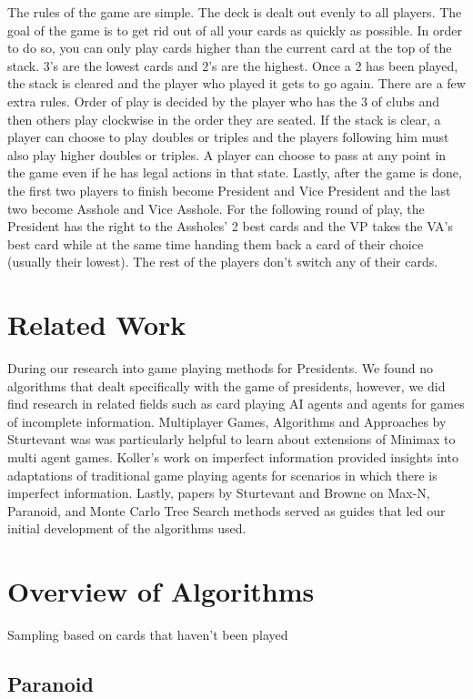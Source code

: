 \documentclass[11pt]{article}
\begin{document}
The rules of the game are simple. The deck is dealt out evenly to all players. The goal of the game is to get rid out of all your cards as quickly as possible. In order to do so, you can only play cards higher than the current card at the top of the stack. 3's are the lowest cards and 2's are the highest. Once a 2 has been played, the stack is cleared and the player who played it gets to go again. There are a few extra rules. Order of play is decided by the player who has the 3 of clubs and then others play clockwise in the order they are seated. If the stack is clear, a player can choose to play doubles or triples and the players following him must also play higher doubles or triples. A player can choose to pass at any point in the game even if he has legal actions in that state. Lastly, after the game is done, the first two players to finish become President and Vice President and the last two become Asshole and Vice Asshole. For the following round of play, the President has the right to the Assholes' 2 best cards and the VP takes the VA's best card while at the same time handing them back a card of their choice (usually their lowest). The rest of the players don't switch any of their cards.

\section{Related Work}

During our research into game playing methods for Presidents. We found no algorithms that dealt specifically with the game of presidents, however, we did find research in related fields such as card playing AI agents and agents for games of incomplete information.  Multiplayer Games, Algorithms and Approaches by Sturtevant was was particularly helpful to learn about extensions of Minimax to multi agent games. Koller's work on imperfect information provided insights into adaptations of traditional game playing agents for scenarios in which there is imperfect information. Lastly, papers by Sturtevant and Browne on Max-N, Paranoid, and Monte Carlo Tree Search methods served as guides that led our initial development of the algorithms used.


\section{Overview of Algorithms}

Sampling based on cards that haven't been played

\subsection{Paranoid}
\end{document}
